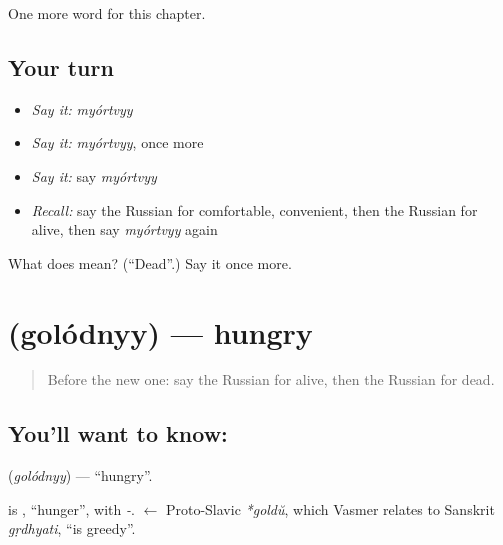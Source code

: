 \begin{grammarlens}[title={What you've built}]
One more word for this chapter.
\end{grammarlens}

\subsection*{Your turn}
\begin{itemize}
\raggedright
  \item \emph{Say it:} \emph{myórtvyy}
  \item \emph{Say it:} \emph{myórtvyy}, once more
  \item \emph{Say it:} say \emph{myórtvyy}
  \item \emph{Recall:} say the Russian for comfortable, convenient, then the Russian for alive, then say \emph{myórtvyy} again
\end{itemize}

\begin{tcolorbox}[breakable,colback=teal!4,colframe=teal!35!black,title={Before you move on}]
What does  mean? (\textquotedblleft{}Dead\textquotedblright{}.) Say it once more.
\end{tcolorbox}
\section[\texorpdfstring{\ru{голодный} (golódnyy)}{голодный (golódnyy)}]{ (golódnyy) — hungry}

\label{lesson:RU-C158-golodnyy}



\begin{quote}
Before the new one: say the Russian for alive, then the Russian for dead.
\end{quote}

\subsection*{You'll want to know: }
\textbf{} (\emph{golódnyy}) — \textquotedblleft{}hungry\textquotedblright{}.

\begin{cousinweb}
\textbf{} is \emph{}, \textquotedblleft{}hunger\textquotedblright{}, with \emph{-}. \emph{} $\leftarrow$ Proto-Slavic \emph{*goldŭ}, which Vasmer relates to Sanskrit \emph{gṛdhyati}, \textquotedblleft{}is greedy\textquotedblright{}.
\end{cousinweb}

